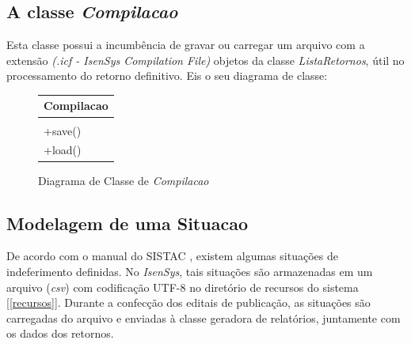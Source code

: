 \documentclass[
	12pt,			%
	openright,		%
	oneside,	
	a4paper,		%
	english,		%
	brazil			%
]{abntex2/abntex2}  %
\begin{document}
			\subsection{A classe \textit{Compilacao}} \label{compilacao}
	
				Esta classe possui a incumbência de gravar ou carregar um arquivo com a extensão \textit{(.icf - IsenSys Compilation File)} objetos da classe \textit{ListaRetornos}, útil no processamento do retorno definitivo. Eis o seu diagrama de classe:
	
				\begin{figure}[ht]
					\begin{center}
						
						\caption{Diagrama de Classe de \textit{Compilacao}}
						
						\begin{tabular}{|l|}
						\hline
						\multicolumn{1}{|c|}{\textbf{Compilacao}} \\ \hline
						\\ \hline
						+save()                                    \\
						+load()                                    \\ \hline
						\end{tabular}
						
					\end{center}
				\end{figure}
	
			\subsection{Modelagem de uma Situacao} \label{situacao}
	
				De acordo com o manual do SISTAC \cite{sistac-formatos}, existem algumas situações de indeferimento definidas. No \textit{IsenSys}, tais situações são armazenadas em um arquivo (\textit{csv}) com codificação UTF-8 no diretório de recursos do sistema [\ref{recursos}]. Durante a confecção dos editais de publicação, as situações são carregadas do arquivo e enviadas à classe geradora de relatórios, juntamente com os dados dos retornos.
	
\end{document}
